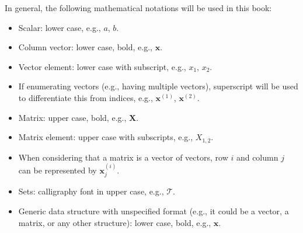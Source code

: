 \notation

In general, the following mathematical notations will be used in this book:

\begin{itemize}
\item Scalar: lower case, e.g., $a$, $b$.
\item Column vector: lower case, bold, e.g., $\textbf{x}$.
\item Vector element: lower case with subscript, e.g., $x_1$, $x_2$.
\item If enumerating vectors (e.g., having multiple vectors), superscript will be used to differentiate this from indices, e.g., $\textbf{x}^{(1)}$, $\textbf{x}^{(2)}$.
\item Matrix: upper case, bold, e.g., $\textbf{X}$.
\item Matrix element: upper case with subscripts, e.g., $X_{1,2}$.
\item When considering that a matrix is a vector of vectors, row $i$ and column $j$ can be represented by $\textbf{x}^{(i)}_j$.
\item Sets: calligraphy font in upper case, e.g., $\mathcal{T}$.
\item Generic data structure with unspecified format (e.g., it could be a vector, a matrix, or any other structure): lower case, bold, e.g., $\textbf{x}$.
\end{itemize}